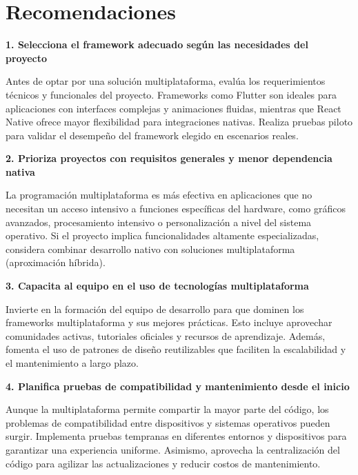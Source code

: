 \newpage
\section{Recomendaciones}

\textbf{1. Selecciona el framework adecuado según las necesidades del proyecto}

Antes de optar por una solución multiplataforma, evalúa los requerimientos técnicos y funcionales del proyecto. Frameworks como Flutter son ideales para aplicaciones con interfaces complejas y animaciones fluidas, mientras que React Native ofrece mayor flexibilidad para integraciones nativas. Realiza pruebas piloto para validar el desempeño del framework elegido en escenarios reales.
	
\textbf{2. Prioriza proyectos con requisitos generales y menor dependencia nativa}

La programación multiplataforma es más efectiva en aplicaciones que no necesitan un acceso intensivo a funciones específicas del hardware, como gráficos avanzados, procesamiento intensivo o personalización a nivel del sistema operativo. Si el proyecto implica funcionalidades altamente especializadas, considera combinar desarrollo nativo con soluciones multiplataforma (aproximación híbrida).
	
\textbf{3.	Capacita al equipo en el uso de tecnologías multiplataforma}

Invierte en la formación del equipo de desarrollo para que dominen los frameworks multiplataforma y sus mejores prácticas. Esto incluye aprovechar comunidades activas, tutoriales oficiales y recursos de aprendizaje. Además, fomenta el uso de patrones de diseño reutilizables que faciliten la escalabilidad y el mantenimiento a largo plazo.
	
\textbf{4.	Planifica pruebas de compatibilidad y mantenimiento desde el inicio}

Aunque la multiplataforma permite compartir la mayor parte del código, los problemas de compatibilidad entre dispositivos y sistemas operativos pueden surgir. Implementa pruebas tempranas en diferentes entornos y dispositivos para garantizar una experiencia uniforme. Asimismo, aprovecha la centralización del código para agilizar las actualizaciones y reducir costos de mantenimiento.
